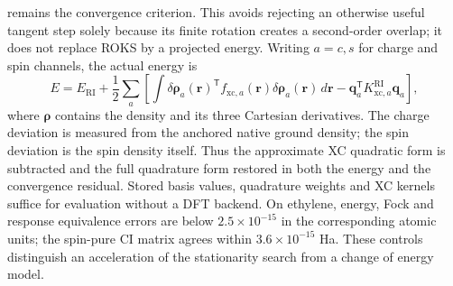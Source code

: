 remains the convergence criterion. This avoids rejecting an otherwise
useful tangent step solely because its finite rotation creates a
second-order overlap; it does not replace ROKS by a projected energy.
Writing $a=c,s$ for charge and spin channels, the actual energy is
\begin{equation}
 E=E_{\mathrm{RI}}+\frac12\sum_a
 \left[\int \delta\bm\rho_a(\mathbf r)^{\mathsf T}
 f_{\mathrm{xc},a}(\mathbf r)\delta\bm\rho_a(\mathbf r)\,d\mathbf r
 -\mathbf q_a^{\mathsf T}K_{\mathrm{xc},a}^{\mathrm{RI}}\mathbf q_a\right],
\end{equation}
where $\bm\rho$ contains the density and its three Cartesian derivatives.
The charge deviation is measured from the anchored native ground density;
the spin deviation is the spin density itself. Thus the approximate XC
quadratic form is subtracted and the full quadrature form restored in
both the energy and the convergence residual. Stored basis values,
quadrature weights and XC kernels suffice for evaluation without a DFT
backend. On ethylene, energy, Fock and response equivalence errors are
below $2.5\times10^{-15}$ in the corresponding atomic units; the spin-pure
CI matrix agrees within $3.6\times10^{-15}$ Ha. These controls distinguish
an acceleration of the stationarity search from a change of energy model.

